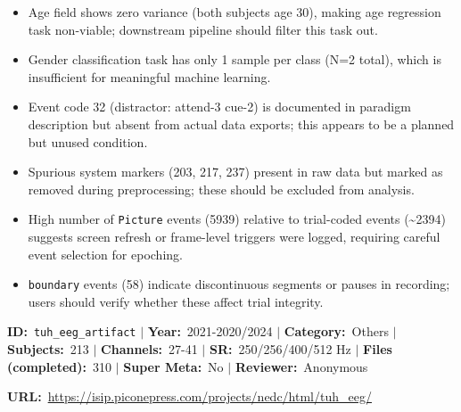 {\begin{tcolorbox}
\begin{itemize}[leftmargin=1.4em,noitemsep,topsep=2pt]
\item{\footnotesize Age field shows zero variance (both subjects age 30), making age regression task non-viable; downstream pipeline should filter this task out.}
\item{\footnotesize Gender classification task has only 1 sample per class (N=2 total), which is insufficient for meaningful machine learning.}
\item{\footnotesize Event code 32 (distractor: attend-3 cue-2) is documented in paradigm description but absent from actual data exports; this appears to be a planned but unused condition.}
\item{\footnotesize Spurious system markers (203, 217, 237) present in raw data but marked as removed during preprocessing; these should be excluded from analysis.}
\item{\footnotesize High number of \texttt{Picture} events (5939) relative to trial-coded events (\textasciitilde{}2394) suggests screen refresh or frame-level triggers were logged, requiring careful event selection for epoching.}
\item{\footnotesize \texttt{boundary} events (58) indicate discontinuous segments or pauses in recording; users should verify whether these affect trial integrity.}
\end{itemize}
\end{tcolorbox}
\vspace{3pt}
\noindent\begin{tcolorbox}[breakable,enhanced,colback=white,colframe=gray!55,boxrule=0.9pt,arc=4pt,left=6pt,right=6pt,top=4pt,bottom=4pt,title={\small\bfseries TUH EEG Artifact Corpus\hfill \colorbox{gray!20}{\scriptsize\sffamily\bfseries Completed}},coltitle=black,colbacktitle=gray!12,titlerule=0.5pt]
{\footnotesize \textbf{ID:}~\texttt{tuh\_eeg\_artifact} $\mid$ \textbf{Year:}~2021-2020/2024 $\mid$ \textbf{Category:}~Others $\mid$ \textbf{Subjects:}~213 $\mid$ \textbf{Channels:}~27-41 $\mid$ \textbf{SR:}~250/256/400/512 Hz $\mid$ \textbf{Files (completed):}~310 $\mid$ \textbf{Super Meta:}~No $\mid$ \textbf{Reviewer:}~Anonymous}
\par{\footnotesize\textbf{URL:}~\url{https://isip.piconepress.com/projects/nedc/html/tuh_eeg/}}
\tcbline
{}\par\smallskip

\end{tcolorbox}}
